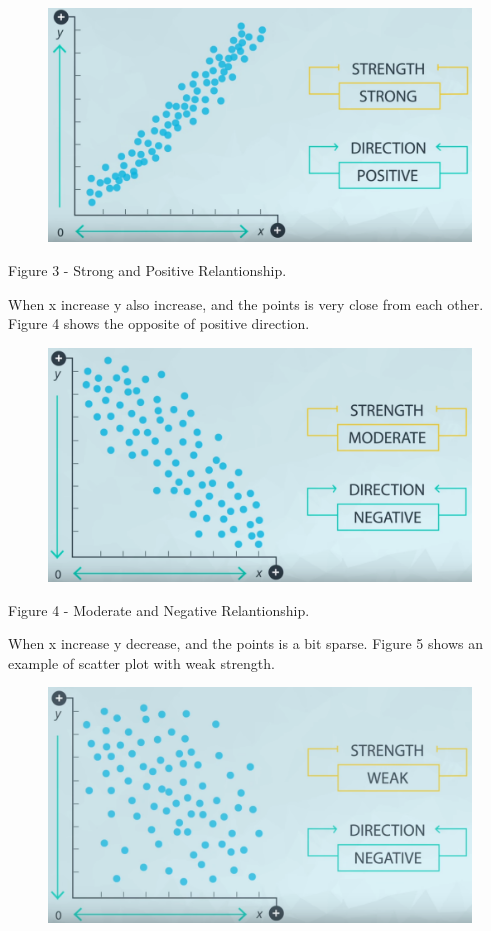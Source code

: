 \documentclass[]{book}
\begin{document}
\begin{figure}
\centering
\includegraphics{01-img/c4_l14_03.png}
\caption{}
\end{figure}

Figure 3 - Strong and Positive Relantionship.

When x increase y also increase, and the points is very close from each
other. Figure 4 shows the opposite of positive direction.

\begin{figure}
\centering
\includegraphics{01-img/c4_l14_04.png}
\caption{}
\end{figure}

Figure 4 - Moderate and Negative Relantionship.

When x increase y decrease, and the points is a bit sparse. Figure 5
shows an example of scatter plot with weak strength.

\begin{figure}
\centering
\includegraphics{01-img/c4_l14_05.png}
\caption{}
\end{figure}
\end{document}
